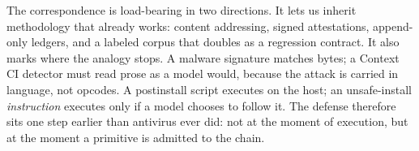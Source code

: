 The correspondence is load-bearing in two directions. It lets us inherit
methodology that already works: content addressing, signed attestations,
append-only ledgers, and a labeled corpus that doubles as a regression
contract. It also marks where the analogy stops. A malware signature
matches bytes; a Context CI detector must read prose as a model would,
because the attack is carried in language, not opcodes. A postinstall
script executes on the host; an unsafe-install \emph{instruction}
executes only if a model chooses to follow it. The defense therefore
sits one step earlier than antivirus ever did: not at the moment of
execution, but at the moment a primitive is admitted to the chain.
